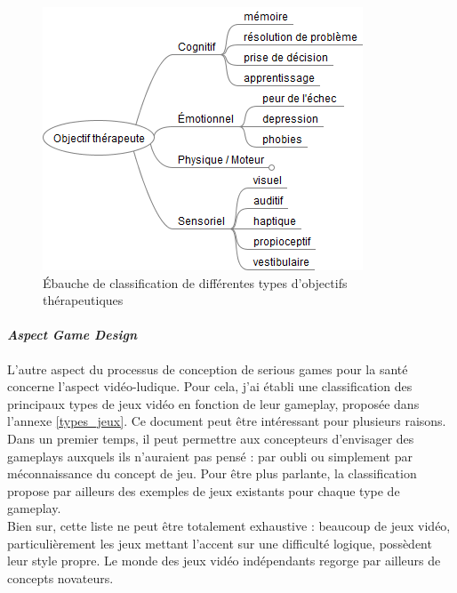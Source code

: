 \begin{figure}[hbtp]
	\centering
	\includegraphics[scale=0.7]{images/objectifs_autres}
	\caption{Ébauche de classification de différentes types d'objectifs thérapeutiques}
	\label{objectifs_autres}
\end{figure}

			\paragraph{\emph{Aspect Game Design}\\}
L'autre aspect du processus de conception de serious games pour la santé concerne l'aspect vidéo-ludique. Pour cela, j'ai établi une classification des principaux types de jeux vidéo en fonction de leur gameplay, proposée dans l'annexe \ref{types_jeux}. Ce document peut être intéressant pour plusieurs raisons. Dans un premier temps, il peut permettre aux concepteurs d'envisager des gameplays auxquels ils n'auraient pas pensé : par oubli ou simplement par méconnaissance du concept de jeu. Pour être plus parlante, la classification propose par ailleurs des exemples de jeux existants pour chaque type de gameplay. \\
Bien sur, cette liste ne peut être totalement exhaustive : beaucoup de jeux vidéo, particulièrement les jeux mettant l'accent sur une difficulté logique, possèdent leur style propre. Le monde des jeux vidéo indépendants regorge par ailleurs de concepts novateurs.

